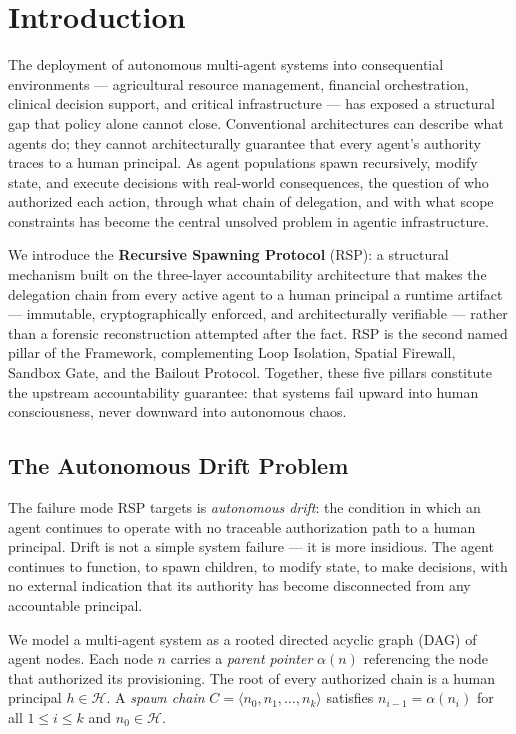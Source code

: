 \section{Introduction}
\label{sec:rs-intro}

The deployment of autonomous multi-agent systems into consequential environments — agricultural resource management, financial orchestration, clinical decision support, and critical infrastructure — has exposed a structural gap that policy alone cannot close. Conventional architectures can describe what agents do; they cannot architecturally guarantee that every agent's authority traces to a human principal. As agent populations spawn recursively, modify state, and execute decisions with real-world consequences, the question of who authorized each action, through what chain of delegation, and with what scope constraints has become the central unsolved problem in agentic infrastructure.

We introduce the \textbf{Recursive Spawning Protocol} (RSP): a structural mechanism built on the \bxthree{} three-layer accountability architecture that makes the delegation chain from every active agent to a human principal a runtime artifact — immutable, cryptographically enforced, and architecturally verifiable — rather than a forensic reconstruction attempted after the fact. RSP is the second named pillar of the \bxthree{} Framework, complementing Loop Isolation, Spatial Firewall, Sandbox Gate, and the Bailout Protocol. Together, these five pillars constitute the upstream accountability guarantee: that \bxthree{} systems fail upward into human consciousness, never downward into autonomous chaos.

\subsection{The Autonomous Drift Problem}

The failure mode RSP targets is \emph{autonomous drift}: the condition in which an agent continues to operate with no traceable authorization path to a human principal. Drift is not a simple system failure — it is more insidious. The agent continues to function, to spawn children, to modify state, to make decisions, with no external indication that its authority has become disconnected from any accountable principal.

We model a multi-agent system as a rooted directed acyclic graph (DAG) of agent nodes. Each node $n$ carries a \emph{parent pointer} $\alpha(n)$ referencing the node that authorized its provisioning. The root of every authorized chain is a human principal $h \in \mathcal{H}$. A \emph{spawn chain} $C = \langle n_0, n_1, \ldots, n_k \rangle$ satisfies $n_{i-1} = \alpha(n_i)$ for all $1 \leq i \leq k$ and $n_0 \in \mathcal{H}$.

